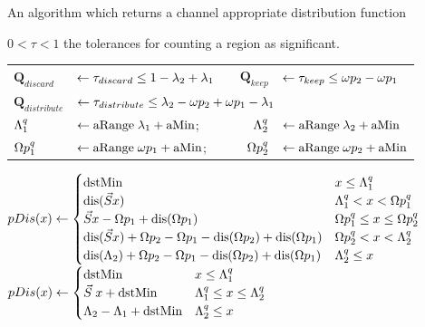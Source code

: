  \begin{algorithm}[H]
  \caption{An algorithm which returns a channel appropriate distribution function}
  \begin{algorithmic}
       \State \phantom{Require} $0<\tau<1$ the tolerances for counting a region as significant.
       \State \begin{tabular}{llcrl}
       $\mathbf{Q}_{discard} $    &  $\gets \tau_{discard}     \le    1-\lambda_2 + \lambda_1$ & \quad\quad&
              $\mathbf{Q}_{keep} $        & $\gets \tau_{keep}         \le     \omega p_2 - \omega p_1$\\
       $\mathbf{Q}_{distribute}$ & \multicolumn{4}{l}{$\gets \tau_{distribute}  \le    \lambda_2 - \omega p_2 + \omega p_1 - \lambda_1$} \\
       $\Lambda_1^{q}$ &$\gets \text{aRange} \; \lambda_1 + \text{aMin}$; & \quad\quad &
       $\Lambda_2^{q}$ &$\gets \text{aRange} \; \lambda_2 + \text{aMin}$ \\
       $\Omega p_1^{q}$    &$\gets \text{aRange} \; \omega p_1   + \text{aMin}$; & \quad\quad &
       $\Omega p_2^{q}$    &$\gets \text{aRange} \; \omega p_2   + \text{aMin}$ 
       \end{tabular} \;
         \State $
          pDis(x) \gets \begin{cases}
          \dstMin & x \le \Discard_1^q \\
          \text{dis}(\Scale x) & \Discard_1^q < x < \eKeep_1^q \\
          \Scale x - \eKeep_1 + \text{dis}(\eKeep_1) & \eKeep_1^q \le x \le \eKeep_2^q  \\
          \text{dis}(\Scale x) + \eKeep_2 - \eKeep_1 - \text{dis}(\eKeep_2) + \text{dis}(\eKeep_1)  & \eKeep_2^q < x < \Discard_2^q  \\
          \text{dis}(\Discard_2) + \eKeep_2 - \eKeep_1 - \text{dis}(\eKeep_2) + \text{dis}(\eKeep_1) & \Discard_2^q \le x\\
          \end{cases}   $
          \State  
          $ pDis(x) \gets \begin{cases}
           \dstMin & x \le \Discard_1^q \\
           \Scale \; x  + \dstMin  & \Discard_1^q \le x \le \Discard_2^q  \\
           \Discard_2 - \Discard_1 + \dstMin  & \Discard_2^q \le x\\
           \end{cases}$
\end{algorithmic}
\end{algorithm}
